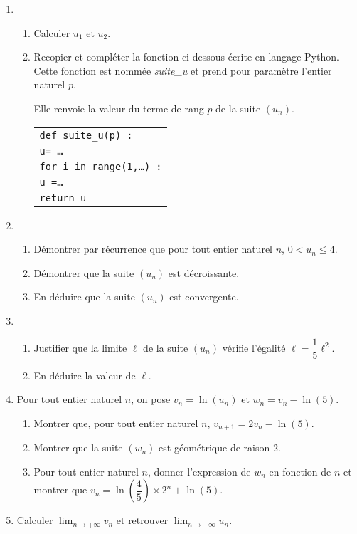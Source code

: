 \documentclass[10pt,a4paper]{article}
\begin{document}
\begin{enumerate}
\item 
	\begin{enumerate}
		\item Calculer $u_1$ et $u_2$.
		\item Recopier et compléter la fonction ci-dessous écrite en langage Python.
Cette fonction est nommée \emph{suite\_u} et prend pour paramètre l'entier naturel $p$.

Elle renvoie la valeur du terme de rang $p$ de la suite $\left(u_n\right)$.

\begin{center}
\begin{tabular}{l}
\texttt{def suite\_u(p) :}\\
	\quad \texttt{u= \ldots}\\
	\quad \texttt{for i in range(1,\ldots) :}\\
	\quad \quad \texttt{u =\ldots}\\
	\quad \texttt{return u}\\
	\end{tabular}
\end{center}

	\end{enumerate}
\item 
	\begin{enumerate}
		\item Démontrer par récurrence que pour tout entier naturel $n$,\: $0 < u_n \leqslant 4$.
		\item Démontrer que la suite $\left(u_n\right)$ est décroissante.
		\item En déduire que la suite $\left(u_n\right)$ est convergente.
	\end{enumerate}
\item 
	\begin{enumerate}
		\item Justifier que la limite $\ell$ de la suite $\left(u_n\right)$ vérifie l'égalité $\ell = \dfrac15 \ell^2$.
		\item En déduire la valeur de $\ell$.
	\end{enumerate}
\item Pour tout entier naturel $n$, on pose $v_n = \ln \left(u_n\right)$ et $w_n = v_n - \ln (5)$.
	\begin{enumerate}
		\item Montrer que, pour tout entier naturel $n$,\: $v_{n+1} = 2v_n - \ln (5)$.
		\item Montrer que la suite $\left(w_n\right)$ est géométrique de raison 2.
		\item Pour tout entier naturel $n$, donner l'expression de $w_n$ en fonction de $n$ et montrer que $v_n = \ln \left(\dfrac45 \right) \times 2^n + \ln (5)$.
	\end{enumerate}
\item Calculer $\displaystyle\lim_{n \to + \infty} v_n$ et retrouver $\displaystyle\lim_{n \to + \infty} u_n$.
\end{enumerate}
\end{document}
